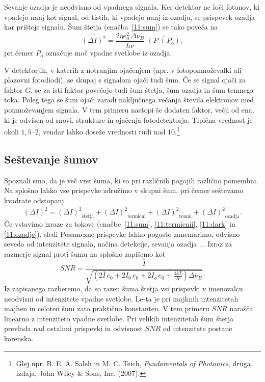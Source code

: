 Sevanje ozadja je neodvisno od vpadnega signala. Ker detektor ne loči fotonov, ki 
vpadejo nanj kot signal, od tistih, ki vpadejo nanj iz ozadja, se prispevek ozadja 
kar prišteje signalu. Šum štetja (enačba~\ref{11:sum}) se tako poveča na
\begin{equation}
\overline{(\Delta I)^2} = \frac{2 \eta e_0^2\, \Delta\nu_B}{h\nu}\,\,
\overline{\left( P + P_o \right)},
\label{11:ozadje}
\end{equation}
pri čemer $P_o$ označuje moč vpadne svetlobe iz ozadja.

\begin{remark}
 V detektorjih, v katerih z notranjim ojačenjem
 (npr. v fotopomnoževalki
  ali plazovni fotodiodi),
 se skupaj s signalom ojači tudi šum. Če se signal ojači za faktor $G$, se za isti faktor
 povečajo tudi šum štetja, šum ozadja in šum temnega toka. Poleg tega se šum ojači
 zaradi naključnega večanja števila elektronov med pomnoževanjem signala. V tem primeru nastopi
 še dodaten faktor, večji od ena, ki je odvisen od snovi, strukture in ojačenja fotodetektorja. 
 Tipična vrednost je okoli $1,5$--$2$, vendar lahko doseže vrednosti tudi nad 
 $10$.\footnote{Glej npr. B. E. A. Saleh in M. C. Teich, 
{\it Fundamentals of Photonics}, druga izdaja, John Wiley \& Sons, Inc. (2007).}
\end{remark}

\subsection*{Seštevanje šumov}
Spoznali smo, da je več vrst šuma, ki so pri različnih pogojih različno pomembni.
Na splošno lahko vse prispevke združimo v skupni šum, pri čemer seštevamo kvadrate
odstopanj
\begin{equation}
\overline{(\Delta I)^2} = \overline{(\Delta I)^2}_{\mathrm{\check{s}tetja}} + 
\overline{(\Delta I)^2}_{\mathrm{termi\check{c}ni}} + \overline{(\Delta I)^2}_{\mathrm{temni}} + 
\overline{(\Delta I)^2}_{\mathrm{ozadja}}.
\end{equation}
Če vstavimo izraze za tokove (enačbe~\ref{11:sum}, \ref{11:termicnii}, \ref{11:dark}
in \ref{11:ozadje}), sledi
Posamezne prispevke lahko pogosto zanemarimo, odvisno seveda od intenzitete signala,
načina detekcije, sevanja ozadja ... Izraz za razmerje signal proti šumu na splošno 
zapišemo kot
\begin{equation}
SNR = \frac{\overline{I}}{\sqrt{\left( 2 \overline{I}\,e_0 + 2 I_0\,e_0
+ 2 I_o\,e_0 + \frac{4 kT}{R} \right) \Delta\nu_B}}.
\end{equation}
Iz zapisanega razberemo, da so razen šuma štetja vsi prispevki v 
imenovalcu neodvisni od intenzitete vpadne svetlobe. Le-ta je pri 
majhnih intenzitetah majhen in celoten šum 
zato praktično konstanten. V tem primeru $SNR$ narašča linearno z intenziteto
vpadne svetlobe. Pri velikih intenzitetah šum štetja prevlada nad ostalimi prispevki
in odvisnost $SNR$ od intenzitete postane korenska. 

